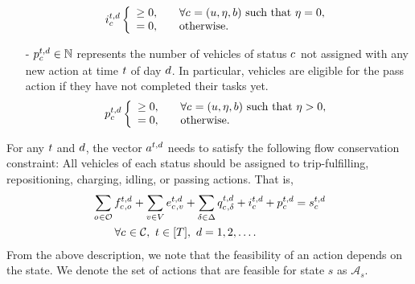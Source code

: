 \begin{itemize}
    \begin{align} \label{eq:setup-idling-flow}
        i^{t,d}_{c_{}} \left\{
        \begin{array}{ll}
            \geq 0, & \quad \text{$\forall c_{} = (u, \eta, b)$ such that $\eta = 0$}, \\
            = 0, & \quad \text{otherwise.}
        \end{array}
        \right.
    \end{align}
    \item[-] \emph{$p^{t,d}_{c_{}} \in \mathbb{N}$} represents the number of vehicles of status $c_{}$ not assigned with any new action at time $t$ of day $d$. In particular, vehicles are eligible for the pass action if they have not completed their tasks yet.
    \begin{align} \label{eq:setup-passing-flow}
        p^{t,d}_{c_{}} \left\{
        \begin{array}{ll}
            \geq 0, & \quad \text{$\forall c_{} = (u, \eta, b)$ such that $\eta > 0$}, \\
            = 0, & \quad \text{otherwise.}
        \end{array}
        \right.
    \end{align}
\end{itemize}

For any $t$ and $d$, the vector $a^{t, d}_{}$ needs to satisfy the following flow conservation constraint: All vehicles of each status should be assigned to trip-fulfilling, repositioning, charging, idling, or passing actions. That is,
\begin{align} \label{eq:setup-cartype-conservation}
    &\sum_{\triptype{} \in \Triptype} \jointtripfulfillaction{\cartype{}, \triptype{}}{\time,\day} + \sum_{\destination \in \Region} \jointreroutingaction{\cartype{}, \destination}{\time,\day} + \sum_{\type \in \Type} \jointchargingaction{\cartype{}, \type}{\time,\day} + \jointidlingaction{\cartype{}}{\time,\day} + \jointpassaction{\cartype{}}{\time,\day} = \state{\cartype{}}{\time,\day} \notag\\
    &\qquad \forall \cartype{} \in \Cartype,\ \time \in [\Horizon],\ \day = 1, 2, \dots.
\end{align}
From the above description, we note that the feasibility of an action depends on the state. We denote the set of actions that are feasible for state $s$ as $\mathcal{A}_s$. 

